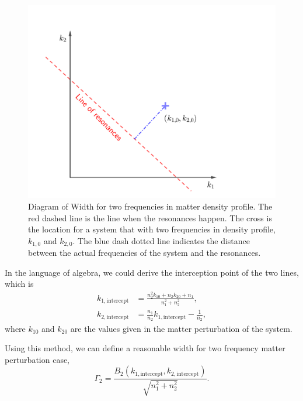 \begin{figure}[!htbp]
    \centering
    \includegraphics[width=\textwidth]{chapters/assets/rabi/stimulated-2-freq-width-diagram}
    \caption{Diagram of Width for two frequencies in matter density profile. The red dashed line is the line when the resonances happen. The cross is the location for a system that with two frequencies in density profile, $k_{1,0}$ and $k_{2,0}$. The blue dash dotted line indicates the distance between the actual frequencies of the system and the resonances. }
    \label{chap:matter-sec:deep-jacobi-fig:diagram-of-width-2-freq}
\end{figure}

In the language of algebra, we could derive the interception point of the two lines, which is
\begin{align}
   k_{1,\mathrm{intercept}} &= \frac{n_2^2 k_{10} + n_2 k_{20} + n_1 }{n_1^2 + n_2^2}, \\
   k_{2,\mathrm{intercept}} &= \frac{n_1}{n_2}k_{1,\mathrm{intercept}} - \frac{1}{n_2},
\end{align}
where $k_{10}$ and $k_{20}$ are the values given in the matter perturbation of the system.

Using this method, we can define a reasonable width for two frequency matter perturbation case,
\begin{equation}
   \Gamma_2 = \frac{B_2(k_{1,\mathrm{intercept}},k_{2,\mathrm{intercept}})}{\sqrt{n_1^2 + n_2^2}}.
\end{equation}


